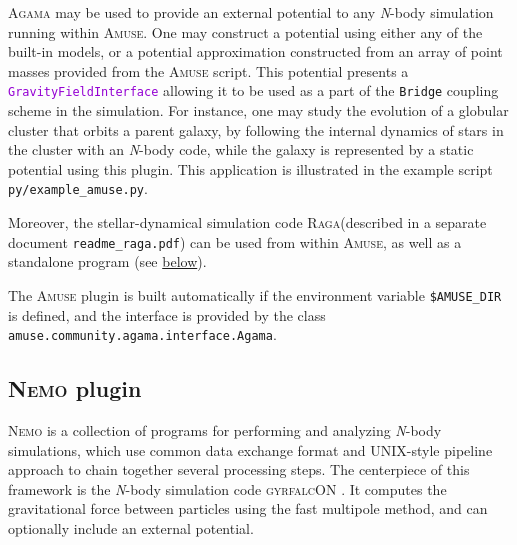 \documentclass[12pt]{article}
\newcommand{\Agama}{\textsc{Agama}\xspace}
\newcommand{\Amuse}{\textsc{Amuse}\xspace}
\newcommand{\Nemo} {\textsc{Nemo}\xspace}
\newcommand{\Raga} {\textsc{Raga}\xspace}
\newcommand{\Nbody}{\textsl{N}-body\xspace}
\newcommand{\ttt}[1]{\textcolor{darkviolet}{\texttt{#1}}}
\begin{document}
\Agama may be used to provide an external potential to any \Nbody simulation running within \Amuse. One may construct a potential using either any of the built-in models, or a potential approximation constructed from an array of point masses provided from the \Amuse script. This potential presents a \ttt{GravityFieldInterface} allowing it to be used as a part of the \texttt{Bridge} coupling scheme in the simulation. For instance, one may study the evolution of a globular cluster that orbits a parent galaxy, by following the internal dynamics of stars in the cluster with an \Nbody code, while the galaxy is represented by a static potential using this plugin. This application is illustrated in the example script \texttt{py/example_amuse.py}.

Moreover, the stellar-dynamical simulation code \Raga (described in a separate document \texttt{readme_raga.pdf}) can be used from within \Amuse, as well as a standalone program (see \hyperref[sec:raga]{below}).

The \Amuse plugin is built automatically if the environment variable \texttt{\$AMUSE_DIR} is defined, and the interface is provided by the class \texttt{amuse.community.agama.interface.Agama}.


\subsection{\Nemo plugin}  \label{sec:Nemo}

\Nemo \cite{Teuben1995} is a collection of programs for performing and analyzing \Nbody simulations, which use common data exchange format and UNIX-style pipeline approach to chain together several processing steps. The centerpiece of this framework is the \Nbody simulation code \textsc{gyrfalcON} \cite{Dehnen2000}. It computes the gravitational force between particles using the fast multipole method, and can optionally include an external potential.
\end{document}
